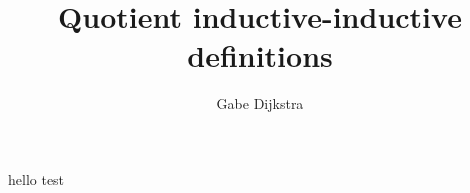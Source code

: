 

\title{Quotient inductive-inductive definitions}
\author{Gabe Dijkstra}



\maketitle

hello test~\cite{Univalent2013}



\appendix



